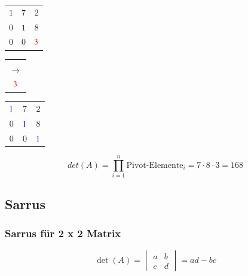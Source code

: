 \begin{minipage}[t]{0.16\columnwidth}
\centering
\renewcommand{\arraystretch}{1.4}
	\begin{tabular}{|c c c|}
		\hline
		$1$ & $7$ & $2$ \\
		$0$ & $1$ & $8$ \\
		$0$ & $0$ & ${\color{red}3}$ \\
		\hline
	\end{tabular}
\end{minipage}
\begin{minipage}[t]{0.045\columnwidth}
\centering
	\begin{tabular}{c}
		\\\\
		$\rightarrow$\\[1.8em]
		${\color{red}3}$
	\end{tabular}
\end{minipage}
\begin{minipage}[t]{0.18\columnwidth}
\centering
\renewcommand{\arraystretch}{1.4}
	\begin{tabular}{|c c c|}
		\hline
		${\color{blue}1}$ 	& $7$ 		& $2$ \\
		$0$ 		& ${\color{blue}1}$ & $8$ \\
		$0$ 		& $0$ 		& ${\color{blue}1}$ \\
		\hline
	\end{tabular}
\end{minipage}
\vspace{0em}
\[ 
	det(A) = \prod_{i=1}^{n} \text{Pivot-Elemente}_i = 7 \cdot 8 \cdot 3 = 168
\]


\subsection{Sarrus}

\subsubsection{Sarrus für 2 x 2 Matrix}

\vspace{-0.2cm}
$$\det(A) = 
\begin{vmatrix}
	a & b \\
	c & d
\end{vmatrix}
=  ad - bc$$
			

